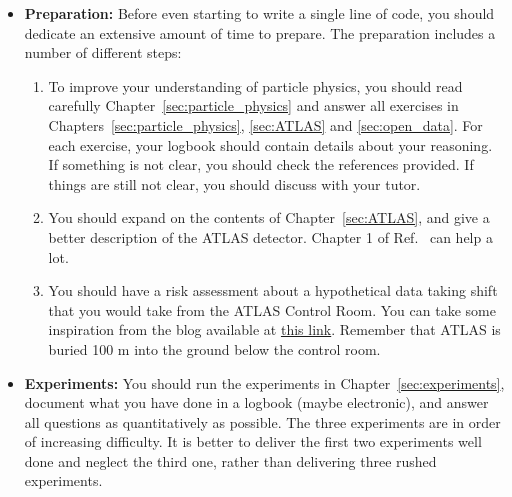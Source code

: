 \begin{itemize}
\item{\textbf{Preparation:}} Before even starting to write a single line of code, you should dedicate an extensive amount of time to prepare. The preparation includes a number of different steps:
\begin{enumerate}
\item To improve your understanding of particle physics, you should read carefully Chapter~\ref{sec:particle_physics} and answer all exercises in Chapters~\ref{sec:particle_physics}, \ref{sec:ATLAS} and \ref{sec:open_data}. For each exercise, your logbook should contain details about your reasoning. If something is not clear, you should check the references provided. If things are still not clear, you should discuss with your tutor. 
\item You should expand on the contents of Chapter~\ref{sec:ATLAS}, and give a better description of the ATLAS detector. Chapter 1 of Ref.~\cite{Aad:2008zzm} can help a lot. 
\item You should have a risk assessment about a hypothetical data taking shift that you would take from the ATLAS Control Room. You can take some inspiration from the blog available at \href{https://atlas.cern/updates/atlas-blog/how-run-particle-detector}{this link}. Remember that ATLAS is buried 100 m into the ground below the control room. 
\end{enumerate}
\item{\textbf{Experiments:}} You should run the experiments in Chapter~\ref{sec:experiments}, document what you have done in a logbook (maybe electronic), and answer all questions as quantitatively as possible. The three experiments are in order of increasing difficulty. It is better to deliver the first two experiments well done and neglect the third one, rather than delivering three rushed experiments.
\end{itemize} 

